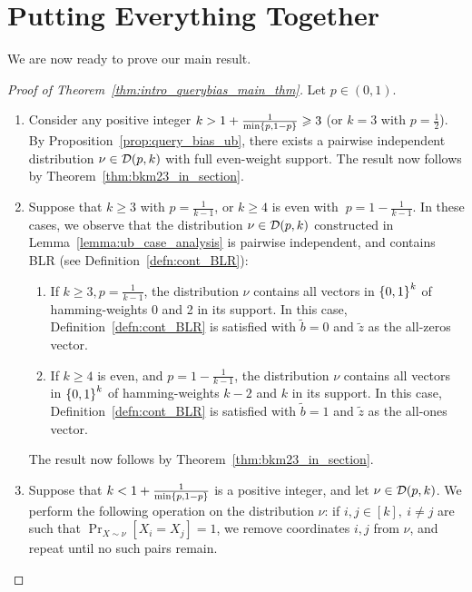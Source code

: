 \section{Putting Everything Together}\label{sec:putting_together}

We are now ready to prove our main result.

\begin{proof}[Proof of Theorem~\ref{thm:intro_querybias_main_thm}]
Let $p\in (0,1)$.

\begin{enumerate}
	\item Consider any positive integer $k > 1 + \frac{1}{\min\left\{ p,1-p \right\}} \geqslant 3$ (or $k=3$ with $p=\frac{1}{2}$).
		By Proposition~\ref{prop:query_bias_ub}, there exists a pairwise independent distribution $\nu\in \mathcal D(p,k)$ with full even-weight support.
		The result now follows by Theorem~\ref{thm:bkm23_in_section}.
	
	\item Suppose that $k\geq 3$ with $p=\frac{1}{k-1}$, or $k\geq 4$ is even with $\ p = 1-\frac{1}{k-1}$.
	In these cases, we observe that the distribution $\nu\in \mathcal D(p,k)$ constructed in Lemma~\ref{lemma:ub_case_analysis} is pairwise independent, and contains BLR (see Definition~\ref{defn:cont_BLR}):
	\begin{enumerate}
		\item If $k\geq 3, p=\frac{1}{k-1}$, the distribution $\nu$ contains all vectors in $\left\{ 0,1 \right\}^k$ of hamming-weights 0 and 2 in its support. In this case, Definition~\ref{defn:cont_BLR} is satisfied with $\tilde{b}=0$ and $\tilde{z}$ as the all-zeros vector.
		\item If $k\geq 4$ is even, and $p=1-\frac{1}{k-1}$, the distribution $\nu$ contains all vectors in $\left\{ 0,1 \right\}^k$ of hamming-weights $k-2$ and $k$ in its support. In this case, Definition~\ref{defn:cont_BLR} is satisfied with $\tilde{b}=1$ and $\tilde{z}$ as the all-ones vector.
	\end{enumerate}
	The result now follows by Theorem~\ref{thm:bkm23_in_section}.
	
	\item Suppose that $k < 1 + \frac{1}{\min\left\{ p,1-p \right\}}$ is a positive integer, and let $\nu \in \mathcal D(p,k)$.
		We perform the following operation on the distribution $\nu$:
		if $i,j\in [k],\ i\not=j$ are such that $\Pr_{X\sim \nu}[X_i=X_j]=1$, we remove coordinates $i,j$ from $\nu$, and repeat until no such pairs remain.
		

\end{enumerate}
\end{proof}
